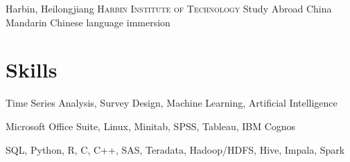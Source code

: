 \documentclass[letterpaper,12pt,color,final]{moderncv}
\begin{document}
{Harbin, Heilongjiang}
{\textsc{Harbin Institute of Technology}}
{Study Abroad}
{China}
{Mandarin Chinese language immersion}

\section{Skills}

{\newline{}
 Time Series Analysis, Survey Design, Machine Learning, Artificial Intelligence}

{\newline{}
 Microsoft Office Suite, Linux, Minitab, SPSS, Tableau, IBM Cognos}

{\newline{}
 SQL, Python, R, C, C++, SAS, Teradata, Hadoop/HDFS, Hive, Impala, Spark}
\end{document}
